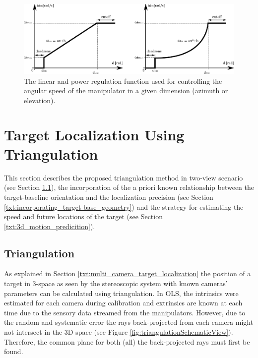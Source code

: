 \begin{figure}[htb]
	\centering
	\includegraphics[width=0.75\linewidth]{fig/regulation_linear_power.pdf}
	\caption{The linear and power regulation function used for controlling the angular speed of the manipulator in a given dimension (azimuth or elevation).}
	\label{fig:regulation_lin_power}
\end{figure}

\section{Target Localization Using Triangulation} \label{txt:target_localization_using_triangulation}

This section describes the proposed triangulation method in two-view scenario (see Section \ref{txt:triangulation}), the incorporation of the a priori known relationship between the target-baseline orientation and the localization precision (see Section \ref{txt:incorporating_target-base_geometry}) and the strategy for estimating the speed and future locations of the target (see Section \ref{txt:3d_motion_predicition}).

\subsection{Triangulation} \label{txt:triangulation}

As explained in Section \ref{txt:multi_camera_target_localization} the position of a target in 3-space as seen by the stereoscopic system with known cameras' parameters can be calculated using triangulation. In OLS, the intrinsics were estimated for each camera during calibration and extrinsics are known at each time due to the sensory data streamed from the manipulators. However, due to the random and systematic error the rays back-projected from each camera might not intersect in the 3D space (see Figure \ref{fig:triangulationSchematicView}). Therefore, the common plane for both (all) the back-projected rays must first be found.

